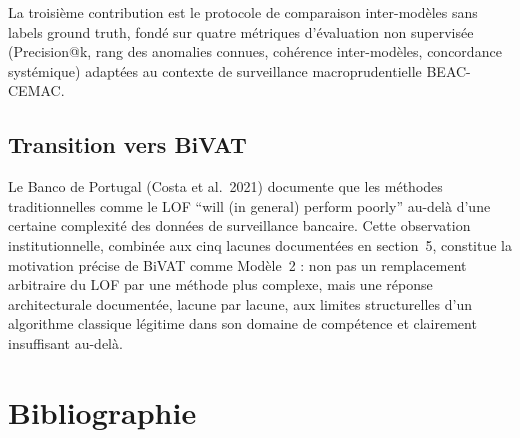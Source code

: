 \documentclass[12pt,a4paper]{article}
\begin{document}
La troisième contribution est le protocole de comparaison inter-modèles sans
labels ground truth, fondé sur quatre métriques d'évaluation non supervisée
(Precision@k, rang des anomalies connues, cohérence inter-modèles,
concordance systémique) adaptées au contexte de surveillance
macroprudentielle BEAC-CEMAC.

\subsection{Transition vers BiVAT}

Le Banco de Portugal (Costa et al.\ 2021) documente que les méthodes
traditionnelles comme le LOF ``will (in general) perform poorly'' au-delà
d'une certaine complexité des données de surveillance bancaire. Cette
observation institutionnelle, combinée aux cinq lacunes documentées en
section~5, constitue la motivation précise de BiVAT comme Modèle~2 : non
pas un remplacement arbitraire du LOF par une méthode plus complexe, mais
une réponse architecturale documentée, lacune par lacune, aux limites
structurelles d'un algorithme classique légitime dans son domaine de
compétence et clairement insuffisant au-delà.

\section*{Bibliographie}
\end{document}
